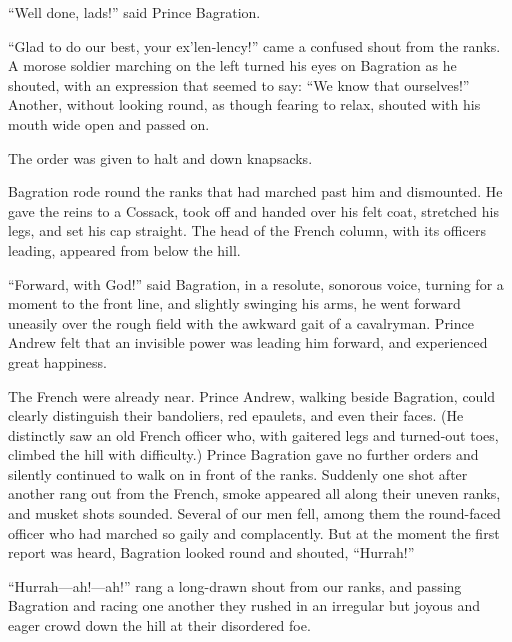 ``Well done, lads!'' said Prince Bagration.

``Glad to do our best, your ex'len-lency!'' came a confused shout
from the ranks. A morose soldier marching on the left turned his
eyes on Bagration as he shouted, with an expression that seemed
to say: ``We know that ourselves!'' Another, without looking
round, as though fearing to relax, shouted with his mouth wide
open and passed on.

The order was given to halt and down knapsacks.

Bagration rode round the ranks that had marched past him and
dismounted.  He gave the reins to a Cossack, took off and handed
over his felt coat, stretched his legs, and set his cap
straight. The head of the French column, with its officers
leading, appeared from below the hill.

``Forward, with God!'' said Bagration, in a resolute, sonorous
voice, turning for a moment to the front line, and slightly
swinging his arms, he went forward uneasily over the rough field
with the awkward gait of a cavalryman. Prince Andrew felt that an
invisible power was leading him forward, and experienced great
happiness.

The French were already near. Prince Andrew, walking beside
Bagration, could clearly distinguish their bandoliers, red
epaulets, and even their faces. (He distinctly saw an old French
officer who, with gaitered legs and turned-out toes, climbed the
hill with difficulty.) Prince Bagration gave no further orders
and silently continued to walk on in front of the ranks. Suddenly
one shot after another rang out from the French, smoke appeared
all along their uneven ranks, and musket shots sounded. Several
of our men fell, among them the round-faced officer who had
marched so gaily and complacently. But at the moment the first
report was heard, Bagration looked round and shouted, ``Hurrah!''

``Hurrah---ah!---ah!'' rang a long-drawn shout from our ranks,
and passing Bagration and racing one another they rushed in an
irregular but joyous and eager crowd down the hill at their
disordered foe.


